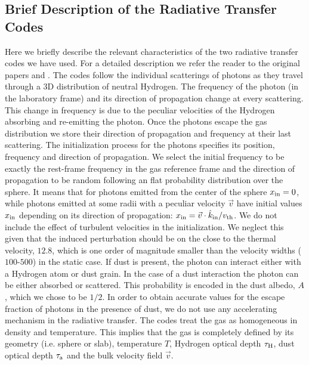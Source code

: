 \subsection{Brief Description of the Radiative Transfer Codes}
Here we briefly describe the relevant characteristics of the two
radiative transfer codes we have used.
For a detailed description we refer the reader to the original papers
\cite{CLARA} and \cite{DijkstraKramer}.
The codes follow the individual scatterings of \ly photons as they
travel through a 3D distribution of neutral Hydrogen.
The frequency of the photon (in the laboratory frame) and
its direction of propagation change at every scattering.
This change in frequency is due to the peculiar velocities of the
Hydrogen absorbing and re-emitting the photon.
Once the photons escape the gas distribution we store their direction of
propagation and frequency at their last scattering.
The initialization process for the \ly photons specifies its
position, frequency and direction of propagation.
We select the initial frequency to be exactly the \ly rest-frame
frequency in the gas reference frame and the direction of propagation
to be random following an flat probability distribution over the sphere.
It means that for photons emitted from the center of the sphere
$x_{\rm in}=0$, while photons emitted at some radii with a peculiar
velocity $\vec{v}$ have initial values $x_{\rm in}$ depending on its direction of
propagation: $x_{\rm in}=\vec{v}\cdot\hat{k}_{\rm in}/v_{\rm th}$.
We do not include the effect of turbulent velocities in the
initialization.
We neglect this given that the induced perturbation should be on the
close to the thermal velocity, $12.8$\kms, which is one order of
magnitude smaller than the velocity widths ($100$-$500$\kms) in the
static case.
If dust is present, the photon can interact either with a Hydrogen
atom or dust grain.
In the case of a dust interaction the photon can be either absorbed or
scattered.
This probability is encoded in the dust albedo, $A$, which we chose
to be $1/2$.
In order to obtain accurate values for the escape fraction of
photons in the presence of dust, we do not use any accelerating
mechanism in the radiative transfer.
The codes treat the gas as homogeneous in density and temperature.
This implies that the gas is completely defined by its geometry
(i.e. sphere or slab), temperature $T$, Hydrogen optical depth
$\tau_{\rm H}$, dust optical depth $\tau_{\rm a}$ and the bulk
velocity field $\vec{v}$.
